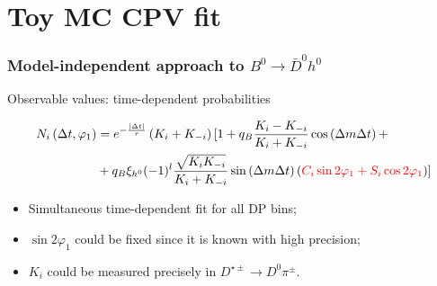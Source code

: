 \documentclass[10 pt,compress,mathserif]{beamer}
\newcommand{\bdh}{\ensuremath{B^0\to \bar D^0h^0}\xspace}
\begin{document}
\section{Toy MC CPV fit}
\frame{\tableofcontents[current]}

\begin{frame}
 \frametitle{Model-independent approach to \bdh}
 Observable values: time-dependent probabilities

 \begin{equation}
 \begin{split}
  N_i\left(\Delta t,\varphi_1\right) &= e^{-\frac{\left|\Delta t\right|}{\tau}}\left(K_{i}+K_{-i}\right)[ 1 + q_{B}\frac{K_{i}-K_{-i}}{K_{i}+K_{-i}}\cos\left(\Delta m\Delta t\right)+\\
  &+q_{B}\xi_{h^0}(-1)^l\frac{\sqrt{K_iK_{-i}}}{K_{i}+K_{-i}}\sin\left(\Delta m\Delta t\right)\left(\textcolor{red}{C_i\sin2\varphi_1+S_i\cos2\varphi_1}\right)]
 \end{split}
 \end{equation}
 
 \begin{itemize}
  \item Simultaneous time-dependent fit for all DP bins;
  \item $\sin2\varphi_1$ could be fixed since it is known with high precision;
  \item $K_i$ could be measured precisely in $D^{\star\pm}\to D^0\pi^{\pm}$.
 \end{itemize}
\end{frame}
\end{document}
